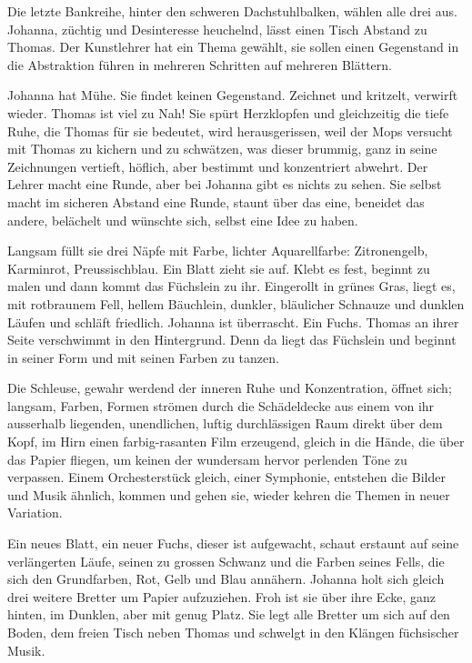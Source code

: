 \documentclass[10pt,titlepage,a5paper]{book}
\begin{document}
Die letzte Bankreihe, hinter den schweren Dachstuhlbalken, wählen alle drei aus. Johanna, züchtig und Desinteresse heuchelnd, lässt einen Tisch Abstand zu Thomas. Der Kunstlehrer hat ein Thema gewählt, sie sollen einen Gegenstand in die Abstraktion führen in mehreren Schritten auf mehreren Blättern.

Johanna hat Mühe. Sie findet keinen Gegenstand. Zeichnet und kritzelt, verwirft wieder. Thomas ist viel zu Nah! Sie spürt Herzklopfen und gleichzeitig die tiefe Ruhe, die Thomas für sie bedeutet, wird herausgerissen, weil der Mops versucht mit Thomas zu kichern und zu schwätzen, was dieser brummig, ganz in seine Zeichnungen vertieft, höflich, aber bestimmt und konzentriert abwehrt. Der Lehrer macht eine Runde, aber bei Johanna gibt es nichts zu sehen. Sie selbst macht im sicheren Abstand eine Runde, staunt über das eine, beneidet das andere, belächelt und wünschte sich, selbst eine Idee zu haben.

Langsam füllt sie drei  Näpfe mit Farbe, lichter Aquarellfarbe: Zitronengelb, Karminrot, Preussischblau. Ein Blatt zieht sie auf. Klebt es fest, beginnt zu malen und dann kommt das Füchslein zu ihr. Eingerollt in grünes Gras, liegt es, mit rotbraunem Fell, hellem Bäuch\-lein, dunkler, bläulicher Schnauze und dunklen Läufen und schläft friedlich. Johanna ist überrascht. Ein Fuchs. Thomas an ihrer Seite verschwimmt in den Hintergrund. Denn da liegt das Füchslein und beginnt in seiner  Form und mit seinen Farben zu tanzen.

Die Schleuse, gewahr werdend der inneren Ruhe und Konzentration, öffnet sich; langsam, Farben, Formen strömen durch die Schä\-del\-decke aus einem von ihr ausserhalb liegenden, unendlichen, luftig durchlässigen Raum direkt über dem Kopf, im Hirn einen farbig-rasanten Film erzeugend, gleich in die Hände, die über das Papier fliegen, um keinen der wundersam hervor perlenden Töne zu verpassen. Einem Orchesterstück gleich, einer Symphonie, entstehen die Bilder und Musik ähnlich, kommen und gehen sie, wieder kehren die Themen in neuer Variation.

Ein neues Blatt, ein neuer Fuchs, dieser ist aufgewacht, schaut erstaunt auf seine verlängerten Läufe, seinen zu grossen Schwanz und die Farben seines Fells, die sich den Grundfarben, Rot, Gelb und Blau annähern. Johanna holt sich gleich drei weitere Bretter um Papier aufzuziehen. Froh ist sie über ihre Ecke, ganz hinten, im Dunklen, aber mit genug Platz. Sie legt alle Bretter um sich auf den Boden, dem freien Tisch neben Thomas und schwelgt in den Klängen füchsischer Musik.
\end{document}
